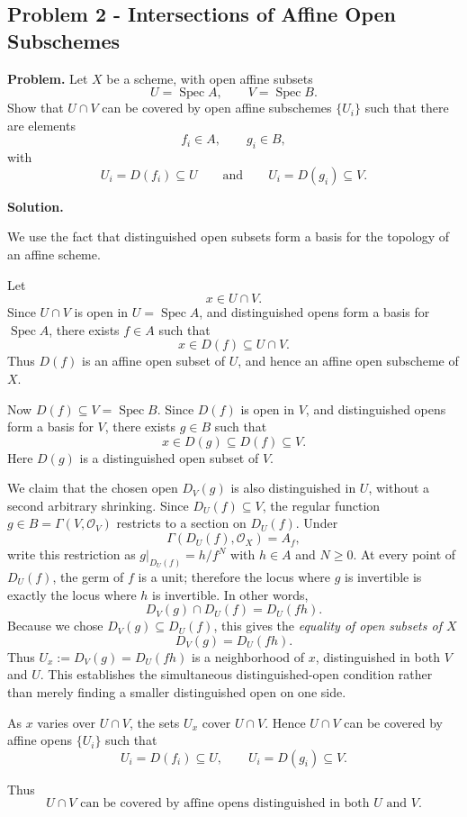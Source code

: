 
\subsection*{Problem 2 - Intersections of Affine Open Subschemes}

\textbf{Problem.}
Let \(X\) be a scheme, with open affine subsets
\[
U=\operatorname{Spec} A,
\qquad
V=\operatorname{Spec} B.
\]
Show that \(U\cap V\) can be covered by open affine subschemes \(\{U_i\}\) such that there are elements
\[
f_i\in A,
\qquad
g_i\in B,
\]
with
\[
U_i=D(f_i)\subseteq U
\qquad\text{and}\qquad
U_i=D(g_i)\subseteq V.
\]

\textbf{Solution.}

We use the fact that distinguished open subsets form a basis for the topology of an affine scheme.

Let
\[
x\in U\cap V.
\]
Since \(U\cap V\) is open in \(U=\operatorname{Spec} A\), and distinguished opens form a basis for \(\operatorname{Spec} A\), there exists \(f\in A\) such that
\[
x\in D(f)\subseteq U\cap V.
\]
Thus \(D(f)\) is an affine open subset of \(U\), and hence an affine open subscheme of \(X\).

Now \(D(f)\subseteq V=\operatorname{Spec} B\). Since \(D(f)\) is open in \(V\), and distinguished opens form a basis for \(V\), there exists \(g\in B\) such that
\[
x\in D(g)\subseteq D(f)\subseteq V.
\]
Here \(D(g)\) is a distinguished open subset of \(V\).

We claim that the chosen open \(D_V(g)\) is also distinguished in
\(U\), without a second arbitrary shrinking. Since
\(D_U(f)\subseteq V\), the regular function \(g\in B=\Gamma(V,\mathcal O_V)\)
restricts to a section on \(D_U(f)\). Under
\[
\Gamma(D_U(f),\mathcal O_X)=A_f,
\]
write this restriction as \(g|_{D_U(f)}=h/f^N\) with \(h\in A\) and
\(N\geq0\). At every point of \(D_U(f)\), the germ of \(f\) is a unit;
therefore the locus where \(g\) is invertible is exactly the locus
where \(h\) is invertible. In other words,
\[
D_V(g)\cap D_U(f)=D_U(fh).
\]
Because we chose \(D_V(g)\subseteq D_U(f)\), this gives the
\emph{equality of open subsets of \(X\)}
\[
D_V(g)=D_U(fh).
\]
Thus \(U_x:=D_V(g)=D_U(fh)\) is a neighborhood of \(x\),
distinguished in both \(V\) and \(U\). This establishes the
simultaneous distinguished-open condition rather than merely finding
a smaller distinguished open on one side.

As \(x\) varies over \(U\cap V\), the sets \(U_x\) cover \(U\cap V\). Hence \(U\cap V\) can be covered by affine opens \(\{U_i\}\) such that
\[
U_i=D(f_i)\subseteq U,
\qquad
U_i=D(g_i)\subseteq V.
\]

Thus
\[
\boxed{
	U\cap V
	\text{ can be covered by affine opens distinguished in both }U\text{ and }V.
}
\]
